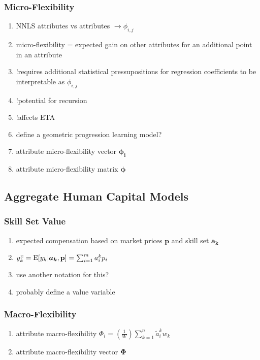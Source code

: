 \documentclass{elsarticle} %
\begin{document}
\subsubsection{Micro-Flexibility}
\begin{enumerate}
    \item NNLS attributes vs attributes $\rightarrow \phi_{i,j}$
    \item micro-flexibility = expected gain on other attributes for an additional point
          in an attribute
    \item !requires additional statistical pressupositions for regression coefficients to be interpretable as $\phi_{i,j}$
    \item !potential for recursion
    \item !affects ETA
    \item define a geometric progression learning model?
    \item attribute micro-flexibility vector $\boldsymbol{\phi_{i}}$
    \item attribute micro-flexibility matrix $\boldsymbol{\phi}$
\end{enumerate}

\subsection{Aggregate Human Capital Models}
\subsubsection{Skill Set Value}
\begin{enumerate}
    \item expected compensation based on market prices $\textbf{p}$ and skill set
          $\boldsymbol{a_k}$
    \item $y_{k}^{\text{\tiny{E}}} = \text{E}[y_k | \boldsymbol{a_k}, \textbf{p}] = \sum_{i=1}^{m}{a_{i}^{k} p_i}$
    \item use another notation for this?
    \item probably define a value variable
\end{enumerate}

\subsubsection{Macro-Flexibility}
\begin{enumerate}
    \item attribute macro-flexibility $\Phi_i = \left( \frac{1}{W} \right)
              \sum_{k=1}^{n}{\tilde{a}_{i}^{k} w_k}$
    \item attribute macro-flexibility vector $\boldsymbol{\Phi}$
\end{enumerate}
\end{document}
